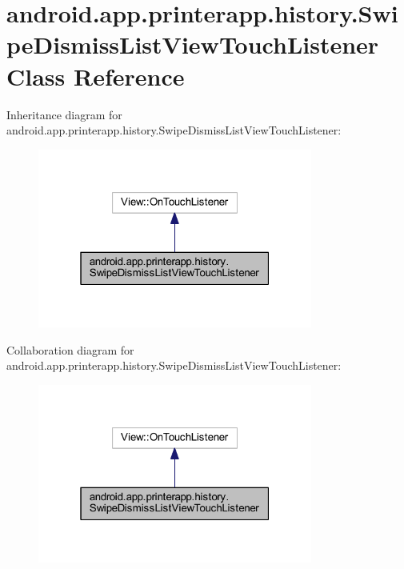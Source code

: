 \hypertarget{classandroid_1_1app_1_1printerapp_1_1history_1_1_swipe_dismiss_list_view_touch_listener}{}\section{android.\+app.\+printerapp.\+history.\+Swipe\+Dismiss\+List\+View\+Touch\+Listener Class Reference}
\label{classandroid_1_1app_1_1printerapp_1_1history_1_1_swipe_dismiss_list_view_touch_listener}


Inheritance diagram for android.\+app.\+printerapp.\+history.\+Swipe\+Dismiss\+List\+View\+Touch\+Listener\+:
\nopagebreak
\begin{figure}[H]
\begin{center}
\leavevmode
\includegraphics[width=256pt]{classandroid_1_1app_1_1printerapp_1_1history_1_1_swipe_dismiss_list_view_touch_listener__inherit__graph}
\end{center}
\end{figure}


Collaboration diagram for android.\+app.\+printerapp.\+history.\+Swipe\+Dismiss\+List\+View\+Touch\+Listener\+:
\nopagebreak
\begin{figure}[H]
\begin{center}
\leavevmode
\includegraphics[width=256pt]{classandroid_1_1app_1_1printerapp_1_1history_1_1_swipe_dismiss_list_view_touch_listener__coll__graph}
\end{center}
\end{figure}
